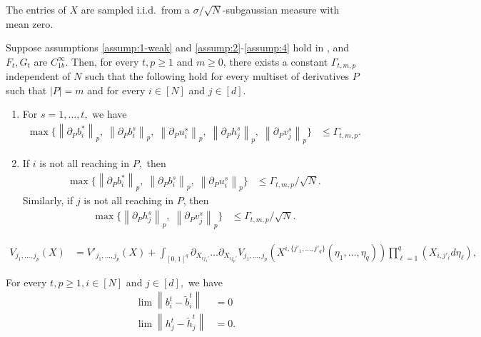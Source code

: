 \documentclass[10pt,a4paper]{amsart}
\newcommand{\norm}[1]{\left\lVert#1\right\rVert}
\begin{document}
\begin{assumptions}
  \item[(A1')]\makeatletter
    \protected@edef{}%
  \makeatother
  \label{assump:1-weak}
  The entries of $X$ are sampled i.i.d.\ from a $\sigma/\sqrt{N}$-subgaussian
  measure with mean zero.
\end{assumptions}

\begin{theorem}\label{thm:derivative-bounds}
    Suppose assumptions \eqref{assump:1-weak} and \eqref{assump:2}-\eqref{assump:4} hold in , and $F_t,G_t$ are $C^\infty_{1b}.$  Then, for every $t,p\geq 1$ and $m \geq 0$, there exists a constant $\Gamma_{t,m,p}$ independent of $N$ such that the following hold for every multiset of derivatives $P$ such that $|P|=m$ and for every $i \in [N]$ and $j \in [d]$.
    \begin{enumerate}
        \item For $s=1,\dots,t,$ we have
        \begin{align*}
            \max\{\norm{\partial_P b^*_i}_p,\; \norm{\partial_P b^s_i}_p, \; \norm{\partial_P u^s_i}_p,\; \norm{\partial_P h^s_j}_p,\; \norm{\partial_P v^s_j}_p \} &\leq \Gamma_{t,m,p}.
        \end{align*}
        \item If $i$ is not all reaching in $P,$ then
        \begin{align*}
            \max\{\norm{\partial_P b^*_i}_p,\; \norm{\partial_P b^s_i}_p, \; \norm{\partial_P u^s_i}_p\} &\leq \Gamma_{t,m,p}/\sqrt{N}.
        \end{align*}
        Similarly, if $j$ is not all reaching in $P$, then
        \begin{align*}
            \max\{\norm{\partial_P h^s_j}_p,\; \norm{\partial_P v^s_j}_p \} &\leq \Gamma_{t,m,p}/\sqrt{N}.
        \end{align*}
    \end{enumerate}
\end{theorem}

\begin{align}
    V_{j_1,\dots,j_p}(X) &= V'_{j_1,\dots,j_p}(X) + \int_{[0,1]^q}  \partial_{X_{ij_1'}}\dots \partial_{X_{ij_p'}}V_{j_1,\dots,j_p}(X^{i,\{j'_1,\dots,j'_q\}}(\eta_1,\dots,\eta_q))\prod_{\ell=1}^q (X_{i,j'_\ell}d\eta_\ell), \label{eq:V-FTC}
\end{align}

\begin{claim}\label{claim:recursive-claim-1}
    For every $t,p\geq 1,i\in [N]$ and $j\in [d],$ we have 
    \begin{align*}
        \lim \norm{b_i^t - \tilde{b}_i^t} &= 0 \\
        \lim \norm{h_j^t - \tilde{h}_j^t} &= 0.
    \end{align*}
\end{claim}
\end{document}

